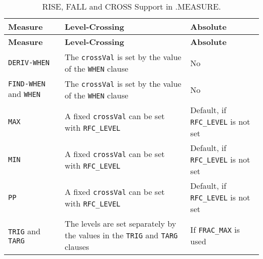 


\begin{longtable}[h] {>{\raggedright\small}m{1.0in}|>{\raggedright\let\\\tabularnewline\small}m{2.5in}
  |>{\raggedright\let\\\tabularnewline\small}m{2.5in}}
  \caption{RISE, FALL and CROSS Support in .MEASURE.} \\ \hline
  \rowcolor{XyceDarkBlue}
  \color{white}\bf Measure &
  \color{white}\bf Level-Crossing &
  \color{white}\bf Absolute \\ \hline \endfirsthead
  \rowcolor{XyceDarkBlue}
  \color{white}\bf Measure &
  \color{white}\bf Level-Crossing &
  \color{white}\bf Absolute \\ \hline \endhead
  \label{RISE_FALL_CROSS}

  \texttt{DERIV-WHEN} & The  \texttt{crossVal} is set by the value of the
                 \texttt{WHEN} clause & No \\ \hline
  \texttt{FIND-WHEN} and \texttt{WHEN} & The  \texttt{crossVal} is set by the
         value of the \texttt{WHEN} clause & No \\ \hline
  \texttt{MAX} & A fixed \texttt{crossVal} can be set with \texttt{RFC\_LEVEL} 
               & Default, if \texttt{RFC\_LEVEL} is not set \\ \hline
  \texttt{MIN} & A fixed \texttt{crossVal} can be set with \texttt{RFC\_LEVEL} 
               & Default, if \texttt{RFC\_LEVEL} is not set \\ \hline
  \texttt{PP} & A fixed \texttt{crossVal} can be set with \texttt{RFC\_LEVEL} 
              & Default, if \texttt{RFC\_LEVEL} is not set \\ \hline
  \texttt{TRIG} and \texttt{TARG} & The levels are set separately by the values 
                in the \texttt{TRIG} and \texttt{TARG} clauses & If 
                \texttt{FRAC\_MAX} is used\\ \hline
\end{longtable}

